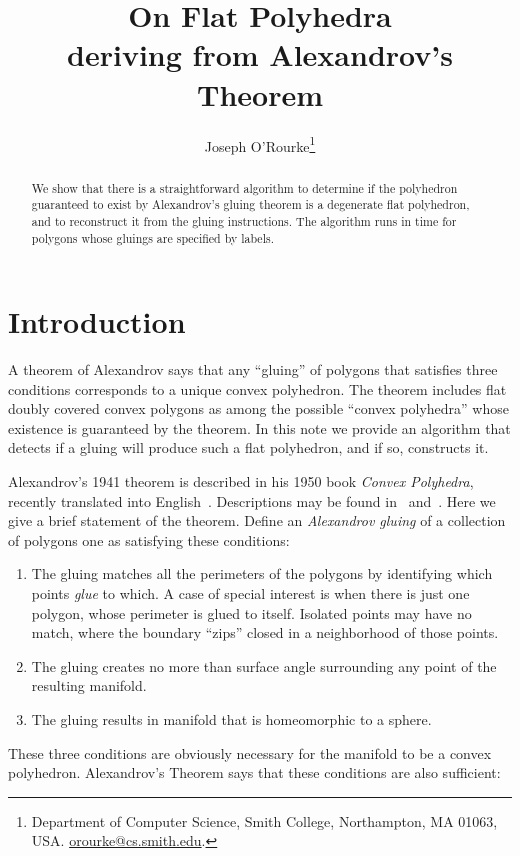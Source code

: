 \pdfoutput=1  \documentclass[]{article}
\title{On Flat Polyhedra \\
deriving from Alexandrov's Theorem
}
\author{Joseph O'Rourke\thanks{Department of Computer Science, Smith College, Northampton, MA
      01063, USA.
      \protect\url{orourke@cs.smith.edu}.}
}
\newcommand{\seclab}[1]{\label{sec:#1}}
\begin{document}
\maketitle

\begin{abstract}
We show that there is a straightforward algorithm to
determine if the polyhedron guaranteed to exist by Alexandrov's
gluing theorem is a degenerate flat polyhedron,
and to reconstruct it from the gluing instructions.
The algorithm runs in  time for polygons whose
gluings are specified by  labels.
\end{abstract}

\section{Introduction}
\seclab{Introduction}
A theorem of Alexandrov says that any ``gluing'' of polygons that
satisfies three conditions corresponds to a unique convex polyhedron.
The theorem includes flat doubly covered convex polygons as
among the possible ``convex polyhedra'' whose existence is
guaranteed by the theorem.
In this note we provide an algorithm that detects if a gluing will
produce such a flat polyhedron, and if so, constructs it.

Alexandrov's 1941 theorem is described in his 1950 book 
\emph{Convex Polyhedra}, recently translated into
English~\cite{a-cp-05}.
Descriptions may be found in~\cite[Sec.~23.3]{do-gfalop-07}
and~\cite[Sec.~37]{p-ldpg-10}.
Here we give a brief statement of the theorem.
Define an \emph{Alexandrov gluing} of a collection of polygons
one as satisfying these conditions:

\begin{enumerate}
\item The gluing matches all the perimeters of the polygons
by identifying which points \emph{glue} to which.
A case of special interest is when there is just one polygon,
whose perimeter is glued to itself.
Isolated points may have no match, where the boundary 
``zips'' closed in a neighborhood of those points.
\item The gluing creates no more than  surface 
angle surrounding any point
of the resulting manifold.
\item The gluing results in manifold that is homeomorphic to a sphere.
\end{enumerate}

These three conditions are obviously necessary for the manifold to be
a convex polyhedron.  Alexandrov's Theorem says that these conditions
are also sufficient:
\end{document}
